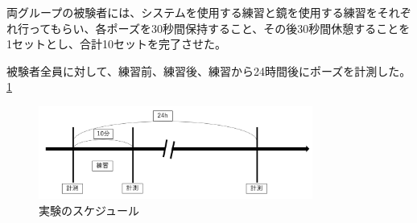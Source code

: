 両グループの被験者には、システムを使用する練習と鏡を使用する練習をそれぞれ行ってもらい、各ポーズを30秒間保持すること、その後30秒間休憩することを1セットとし、合計10セットを完了させた。

被験者全員に対して、練習前、練習後、練習から24時間後にポーズを計測した。\ref{fig:schedule}

\begin{figure}[H]
\begin{center}
\includegraphics[width=9cm]{figures/schedule.png}
\caption{実験のスケジュール}
\label{fig:schedule}
\end{center}
\end{figure}